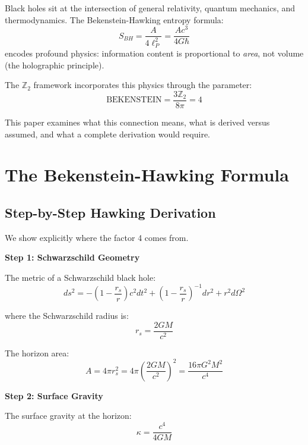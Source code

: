 \documentclass[12pt,a4paper]{article}
\begin{document}
Black holes sit at the intersection of general relativity, quantum mechanics, and thermodynamics. The Bekenstein-Hawking entropy formula:
\begin{equation}
S_{BH} = \frac{A}{4\ell_P^2} = \frac{Ac^3}{4G\hbar}
\end{equation}
encodes profound physics: information content is proportional to \textit{area}, not volume (the holographic principle).

The $\mathbb{Z}_2$ framework incorporates this physics through the parameter:
\begin{equation}
\text{BEKENSTEIN} = \frac{3\mathbb{Z}_2}{8\pi} = 4
\end{equation}

This paper examines what this connection means, what is derived versus assumed, and what a complete derivation would require.

\section{The Bekenstein-Hawking Formula}

\subsection{Step-by-Step Hawking Derivation}

We show explicitly where the factor 4 comes from.

\textbf{Step 1: Schwarzschild Geometry}

The metric of a Schwarzschild black hole:
\begin{equation}
ds^2 = -\left(1 - \frac{r_s}{r}\right)c^2 dt^2 + \left(1 - \frac{r_s}{r}\right)^{-1}dr^2 + r^2 d\Omega^2
\end{equation}

where the Schwarzschild radius is:
\begin{equation}
r_s = \frac{2GM}{c^2}
\end{equation}

The horizon area:
\begin{equation}
A = 4\pi r_s^2 = 4\pi \left(\frac{2GM}{c^2}\right)^2 = \frac{16\pi G^2 M^2}{c^4}
\end{equation}

\textbf{Step 2: Surface Gravity}

The surface gravity at the horizon:
\begin{equation}
\kappa = \frac{c^4}{4GM}
\end{equation}
\end{document}
